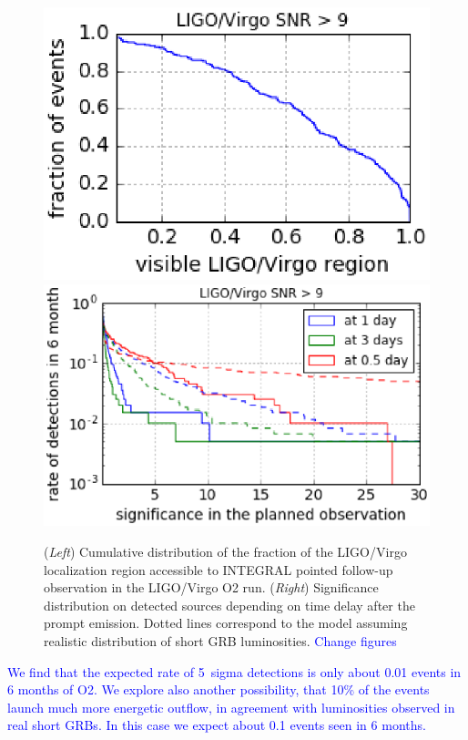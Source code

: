 \documentclass[11pt]{article}
\begin{document}
\begin{figure}[!ht]
	\centering
  	\includegraphics[scale=.5]{P7-1_f3.eps}
  	\includegraphics[scale=.4]{P7-1_f4.eps}

  	\caption{(\textit{Left}) Cumulative distribution of the
    fraction of the LIGO/Virgo localization region accessible to
    INTEGRAL pointed follow-up observation in the LIGO/Virgo O2
    run. (\textit{Right}) Significance distribution on detected
    sources depending on time delay after the prompt emission. Dotted
    lines correspond to the model assuming realistic distribution of short GRB luminosities. \textcolor{blue}{Change figures}}
    \label{covered_region}
\end{figure}

\textcolor{blue}{We find that the expected rate of 5~sigma detections is only about
0.01 events in 6 months of O2. We explore also another
possibility, that 10\% of the events launch much more energetic
outflow, in agreement with luminosities observed in real short
GRBs. In this case we expect about 0.1 events seen in 6 months.}
\end{document}
